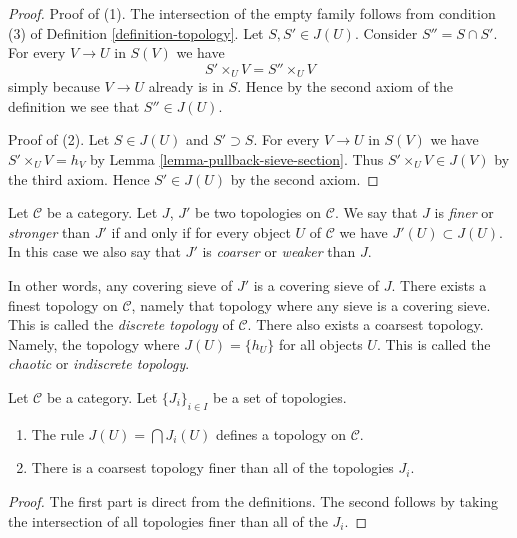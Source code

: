 \begin{proof}
Proof of (1). The intersection of the empty family follows from condition
(3) of Definition \ref{definition-topology}.
Let $S, S' \in J(U)$. Consider $S'' = S \cap S'$. For every
$V \to U$ in $S(V)$ we have
$$
S' \times_U V = S'' \times_U V
$$
simply because $V \to U$ already is in $S$. Hence by the second
axiom of the definition we see that $S'' \in J(U)$.

\medskip\noindent
Proof of (2). Let $S \in J(U)$ and $S' \supset S$. For every
$V \to U$ in $S(V)$ we have $S' \times_U V = h_V$ by
Lemma \ref{lemma-pullback-sieve-section}. Thus
$S' \times_U V \in J(V)$ by the third axiom. Hence
$S' \in J(U)$ by the second axiom.
\end{proof}

\begin{definition}
\label{definition-finer}
Let $\mathcal{C}$ be a category. Let $J$, $J'$ be
two topologies on $\mathcal{C}$. We say that $J$ is
{\it finer} or {\it stronger} than $J'$ if and only if for every object
$U$ of $\mathcal{C}$ we have $J'(U) \subset J(U)$.
In this case we also say that $J'$ is
{\it coarser} or {\it weaker} than $J$.
\end{definition}

\noindent
In other words, any covering sieve of $J'$ is a
covering sieve of $J$. There exists a finest topology
on $\mathcal{C}$, namely that topology where any sieve
is a covering sieve. This is called the
{\it discrete topology} of $\mathcal{C}$.
There also exists a coarsest topology.
Namely, the topology where $J(U) = \{h_U\}$
for all objects $U$. This is called the
{\it chaotic} or {\it indiscrete topology}.

\begin{lemma}
\label{lemma-play-with-topologies}
Let $\mathcal{C}$ be a category.
Let $\{J_i\}_{i\in I}$ be a set of topologies.
\begin{enumerate}
\item The rule $J(U) = \bigcap J_i(U)$ defines
a topology on $\mathcal{C}$.
\item There is a coarsest topology finer than
all of the topologies $J_i$.
\end{enumerate}
\end{lemma}

\begin{proof}
The first part is direct from the definitions.
The second follows by taking the intersection
of all topologies finer than all of the $J_i$.
\end{proof}

